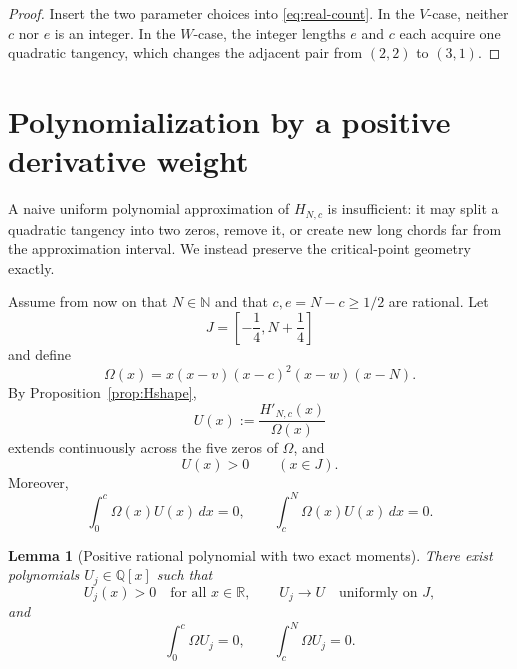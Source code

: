 \documentclass[11pt]{article}
\newtheorem{lemma}[theorem]{Lemma}
\theoremstyle{definition}
\theoremstyle{remark}
\newcommand{\R}{\mathbb{R}}
\newcommand{\N}{\mathbb{N}}
\begin{document}
\begin{proof}
Insert the two parameter choices into \eqref{eq:real-count}.  In the
\(V\)-case, neither \(c\) nor \(e\) is an integer.  In the \(W\)-case,
the integer lengths \(e\) and \(c\) each acquire one quadratic tangency,
which changes the adjacent pair from \((2,2)\) to \((3,1)\).
\end{proof}

\section{Polynomialization by a positive derivative weight}

A naive uniform polynomial approximation of \(H_{N,c}\) is insufficient:
it may split a quadratic tangency into two zeros, remove it, or create new
long chords far from the approximation interval.  We instead preserve the
critical-point geometry exactly.

Assume from now on that \(N\in\N\) and that \(c,e=N-c\ge1/2\) are
rational.  Let
\[
J=\left[-\frac14,N+\frac14\right]
\]
and define
\[
\Omega(x)
=
x(x-v)(x-c)^2(x-w)(x-N).
\tag{7.1}\label{eq:Omega}
\]
By Proposition~\ref{prop:Hshape},
\[
U(x):=\frac{H'_{N,c}(x)}{\Omega(x)}
\]
extends continuously across the five zeros of \(\Omega\), and
\[
U(x)>0\qquad(x\in J).
\]
Moreover,
\[
\int_0^c\Omega(x)U(x)\,dx=0,
\qquad
\int_c^N\Omega(x)U(x)\,dx=0.
\tag{7.2}\label{eq:moments}
\]

\begin{lemma}[Positive rational polynomial with two exact moments]
\label{lem:positive-moment}
There exist polynomials \(U_j\in\mathbb{Q}[x]\) such that
\[
U_j(x)>0\quad\text{for all }x\in\R,
\qquad
U_j\longrightarrow U\quad\text{uniformly on }J,
\]
and
\[
\int_0^c\Omega U_j=0,
\qquad
\int_c^N\Omega U_j=0.
\tag{7.3}\label{eq:exact-moments}
\]
\end{lemma}
\end{document}
